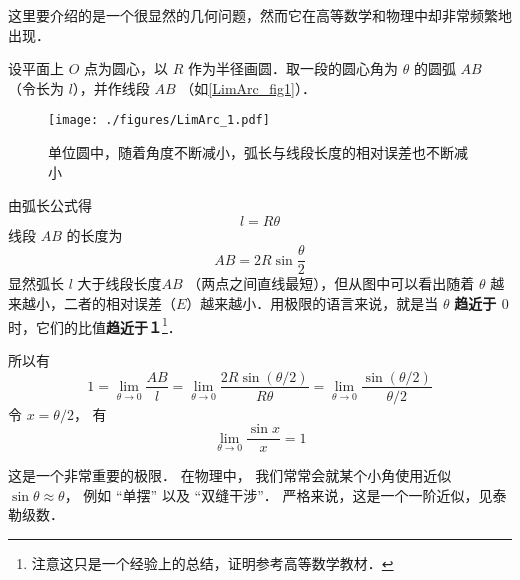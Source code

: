 

这里要介绍的是一个很显然的几何问题，然而它在高等数学和物理中却非常频繁地出现．

设平面上 $O$ 点为圆心，以 $R$ 作为半径画圆．取一段的圆心角为 $\theta $ 的圆弧 $AB$ （令长为 $l$），并作线段 $AB$ （如\autoref{LimArc_fig1}）．

\begin{figure}[ht]
\centering
\texttt{[image: ./figures/LimArc\_1.pdf]}
\caption{单位圆中，随着角度不断减小，弧长与线段长度的相对误差也不断减小}\label{LimArc_fig1}
\end{figure}

由弧长公式得
\begin{equation} \label{LimArc_eq1}
l = R\theta 
\end{equation}
线段 $AB$ 的长度为
\begin{equation}\label{LimArc_eq2}
AB = 2R\sin \frac{\theta }{2}
\end{equation}
显然弧长 $l$ 大于线段长度$AB$ （两点之间直线最短），但从图中可以看出随着 $\theta $ 越来越小，二者的相对误差（$E$）越来越小．用极限的语言来说，就是当 $\theta $ \textbf{趋近于 $0$ } 时，它们的比值\textbf{趋近于１}\footnote{注意这只是一个经验上的总结，证明参考高等数学教材．}．

所以有
\begin{equation}
1=\lim_{\theta\to 0} \frac{AB}{l} = \lim_{\theta\to 0} \frac{2R\sin (\theta/2)}{R\theta} 
= \lim_{\theta\to 0}\frac{\sin (\theta/2)}{\theta/2}
\end{equation}
令 $x = \theta/2$， 有
\begin{equation}
\lim_{\theta\to 0} \frac{\sin x}{x} = 1
\end{equation}

这是一个非常重要的极限． 在物理中， 我们常常会就某个小角使用近似 $\sin \theta \approx \theta$， 例如 “单摆” 以及 “双缝干涉”． 严格来说，这是一个一阶近似，见泰勒级数．
